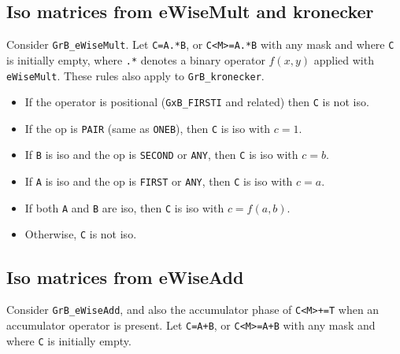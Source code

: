 \documentclass[12pt]{article}
\begin{document}
\subsection{Iso matrices from eWiseMult and kronecker}
\label{iso_emult}

Consider \verb'GrB_eWiseMult'.  Let
\verb'C=A.*B', or \verb'C<M>=A.*B' with any mask and where \verb'C' is
initially empty, where \verb'.*' denotes a binary operator $f(x,y)$
applied with \verb'eWiseMult'.  These rules also apply to \verb'GrB_kronecker'.

    \begin{itemize}
    \item If the operator is positional (\verb'GxB_FIRSTI' and related) then
    \verb'C' is not iso.

    \item If the op is \verb'PAIR' (same as \verb'ONEB'),
        then \verb'C' is iso with $c=1$.

    \item If \verb'B' is iso and the op is \verb'SECOND' or \verb'ANY',
        then \verb'C' is iso with $c=b$.

    \item If \verb'A' is iso and the op is \verb'FIRST' or \verb'ANY',
        then \verb'C' is iso with $c=a$.

    \item If both \verb'A' and \verb'B' are iso,
        then \verb'C' is iso with $c=f(a,b)$.

    \item Otherwise, \verb'C' is not iso.
    \end{itemize}

\subsection{Iso matrices from eWiseAdd}
\label{iso_add}

Consider \verb'GrB_eWiseAdd', and also the accumulator phase of \verb'C<M>+=T'
when an accumulator operator is present.  Let \verb'C=A+B', or \verb'C<M>=A+B'
with any mask and where \verb'C' is initially empty.
\end{document}
